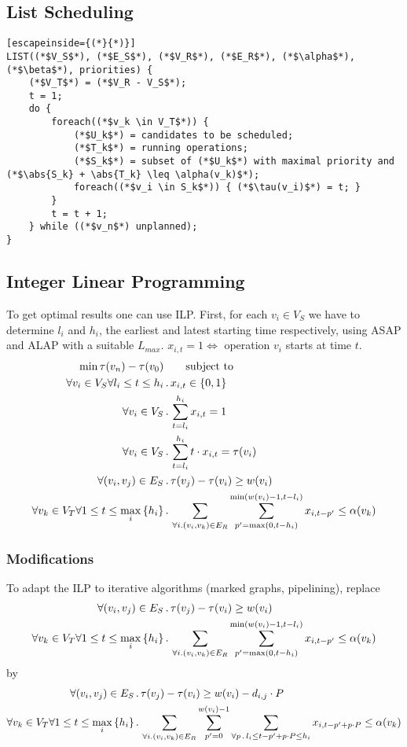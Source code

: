 \subsection{List Scheduling}
\begin{lstlisting}[escapeinside={(*}{*)}]
LIST((*$V_S$*), (*$E_S$*), (*$V_R$*), (*$E_R$*), (*$\alpha$*), (*$\beta$*), priorities) {
	(*$V_T$*) = (*$V_R - V_S$*);
	t = 1;
	do {
		foreach((*$v_k \in V_T$*)) {
			(*$U_k$*) = candidates to be scheduled;
			(*$T_k$*) = running operations;
			(*$S_k$*) = subset of (*$U_k$*) with maximal priority and (*$\abs{S_k} + \abs{T_k} \leq \alpha(v_k)$*);
			foreach((*$v_i \in S_k$*)) { (*$\tau(v_i)$*) = t; }
		}
		t = t + 1;
	} while ((*$v_n$*) unplanned);
}
\end{lstlisting}

\subsection{Integer Linear Programming}
To get optimal results one can use ILP. First, for each $v_i \in V_S$ we have
to determine $l_i$ and $h_i$, the earliest and latest starting time
respectively, using ASAP and ALAP with a suitable $L_{max}$. $x_{i,t} = 1 \iff$
operation $v_i$ starts at time $t$.
\begin{align*}
	\min \tau(v_n) - \tau(v_0) &\qquad \text{subject to} \\
	\forall v_i \in V_S \forall l_i \leq t \leq h_i &\,.\,x_{i,t} \in \left\lbrace 0, 1 \right\rbrace \\
	\forall v_i \in V_S &\,.\, \sum_{t = l_i}^{h_i} x_{i,t} = 1 \\
	\forall v_i \in V_S &\,.\, \sum_{t = l_i}^{h_i} t \cdot x_{i,t} = \tau(v_i) \\
	\forall (v_i, v_j) \in E_S &\,.\, \tau(v_j) - \tau(v_i) \geq w(v_i) \\
	\forall v_k \in V_T \forall 1 \leq t \leq \max_i\left\lbrace h_i \right\rbrace &\,.\, \sum_{\forall i. (v_i, v_k) \in E_R} \sum_{p' = \max(0, t - h_i)}^{\min(w(v_i) - 1, t - l_i)} x_{i, t - p'} \leq \alpha(v_k)
\end{align*}

\subsubsection{Modifications}
To adapt the ILP to iterative algorithms (marked graphs, pipelining), replace
\begin{align*}
	\forall (v_i, v_j) \in E_S &\,.\, \tau(v_j) - \tau(v_i) \geq w(v_i) \\
	\forall v_k \in V_T \forall 1 \leq t \leq \max_i\left\lbrace h_i \right\rbrace &\,.\, \sum_{\forall i. (v_i, v_k) \in E_R} \sum_{p' = \max(0, t - h_i)}^{\min(w(v_i) - 1, t - l_i)} x_{i, t - p'} \leq \alpha(v_k)
\end{align*}
by
\begin{align*}
	\forall (v_i, v_j) \in E_S &\,.\, \tau(v_j) - \tau(v_i) \geq w(v_i) - d_{i,j} \cdot P\\
	\forall v_k \in V_T \forall 1 \leq t \leq \max_i\left\lbrace h_i \right\rbrace &\,.\, \sum_{\forall i. (v_i, v_k) \in E_R}
	\sum_{p' = 0}^{w(v_i) - 1} \sum_{\forall p \,.\, l_i \leq t - p' + p \cdot P \leq h_i} x_{i, t - p' + p \cdot P} \leq \alpha(v_k)
\end{align*}

